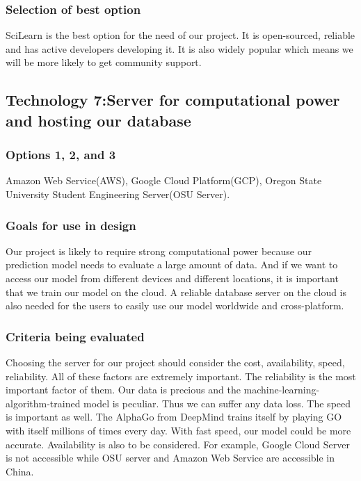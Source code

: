 \documentclass[journal,onecolumn]{IEEEtran}
\begin{document}
\subsubsection{Selection of best option}
SciLearn is the best option for the need of our project. It is open-sourced, reliable and has active developers developing it. It is also widely popular which means we will be more likely to get community support.




\subsection{Technology 7:Server for computational power and hosting our database}

\subsubsection{Options 1, 2, and 3}
Amazon Web Service(AWS), Google Cloud Platform(GCP), Oregon State University Student Engineering Server(OSU Server). 
\subsubsection{Goals for use in design}
Our project is likely to require strong computational power because our prediction model needs to evaluate a large amount of data. And if we want to access our model from different devices and different locations, it is important that we train our model on the cloud. A reliable database server on the cloud is also needed for the users to easily use our model worldwide and cross-platform.
\subsubsection{Criteria being evaluated}
Choosing the server for our project should consider the cost, availability, speed, reliability. All of these factors are extremely important. The reliability is the most important factor of them. Our data is precious and the machine-learning-algorithm-trained model is peculiar. Thus we can suffer any data loss. The speed is important as well. The AlphaGo from DeepMind trains itself by playing GO with itself millions of times every day. With fast speed, our model could be more accurate. Availability is also to be considered. For example, Google Cloud Server is not accessible while OSU server and Amazon Web Service are accessible in China. 
\end{document}
